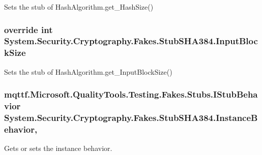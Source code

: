 Sets the stub of Hash\-Algorithm.\-get\-\_\-\-Hash\-Size()

\hypertarget{class_system_1_1_security_1_1_cryptography_1_1_fakes_1_1_stub_s_h_a384_a312ba9c29ed26748c5628a9327e8995e}{
\subsubsection[{Input\-Block\-Size}]{\setlength{\rightskip}{0pt plus 5cm}override int System.\-Security.\-Cryptography.\-Fakes.\-Stub\-S\-H\-A384.\-Input\-Block\-Size\hspace{0.3cm}{\ttfamily [get]}}}\label{class_system_1_1_security_1_1_cryptography_1_1_fakes_1_1_stub_s_h_a384_a312ba9c29ed26748c5628a9327e8995e}


Sets the stub of Hash\-Algorithm.\-get\-\_\-\-Input\-Block\-Size()

\hypertarget{class_system_1_1_security_1_1_cryptography_1_1_fakes_1_1_stub_s_h_a384_a2aab5d0e87d36ea48a614e78d3c0048b}{
\subsubsection[{Instance\-Behavior}]{\setlength{\rightskip}{0pt plus 5cm}mqttf.\-Microsoft.\-Quality\-Tools.\-Testing.\-Fakes.\-Stubs.\-I\-Stub\-Behavior System.\-Security.\-Cryptography.\-Fakes.\-Stub\-S\-H\-A384.\-Instance\-Behavior\hspace{0.3cm}{\ttfamily [get]}, {\ttfamily [set]}}}\label{class_system_1_1_security_1_1_cryptography_1_1_fakes_1_1_stub_s_h_a384_a2aab5d0e87d36ea48a614e78d3c0048b}


Gets or sets the instance behavior.

